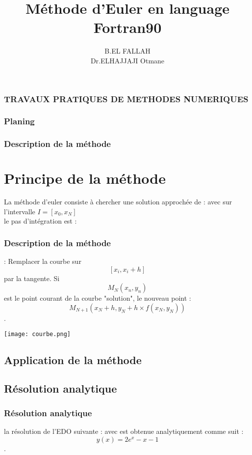 \documentclass[11pt]{beamer}
\author{  B.EL FALLAH\\ {\color{blue}{ Coordonateur:}} Dr.ELHAJJAJI Otmane }
\title{Méthode d'Euler en language Fortran90}
\institute{UAE, Faculté des sciences de Tétouan}
\begin{document}
\begin{frame}
\frametitle{TRAVAUX PRATIQUES DE METHODES NUMERIQUES}
\titlepage
\end{frame}

\begin{frame}
\frametitle{Planing}
\tableofcontents
\end{frame}

\begin{frame}%
\frametitle{Description de la méthode}
\section{Principe de la méthode}
\begin{block}


La méthode d'euler consiste à chercher une solution approchée de :
{} avec { }
sur l'intervalle $ I=[x_{0},x_{N}] $\\
le pas d'intégration est :{}
\end{block}
\end{frame}
\begin{frame}
\frametitle{Description de la méthode}
\begin{minipage}[r]{0.48\textwidth} \hfill

\begin{block}


{\color{red}{
Géométriquement}} : Remplacer la courbe sur $$ [x_{i} , x_{i}+h] $$ par la tangente.
Si $$ M_{N}(x_{n} , y_{n})$$ est le point courant de la courbe "solution", le nouveau point :\\
 $$ M_{N+1}(x_{N} +h , y_{N}+ h\times f(x_{N} , y_{N})) $$ .
\end{block}
\end{minipage}
\begin{minipage}[l]{0.45\textwidth} 
\texttt{[image: courbe.png]}
\end{minipage}
\end{frame}
\begin{frame}
\section{Application de la méthode}
\subsection{Résolution analytique}
\frametitle{Résolution analytique}
\begin{block}


la résolution de l'EDO suivante :
{}
avec { }
est obtenue analytiquement comme suit :
$$ y(x)=2e^{x}-x-1 $$.
\end{block}
\end{frame}
\end{document}
